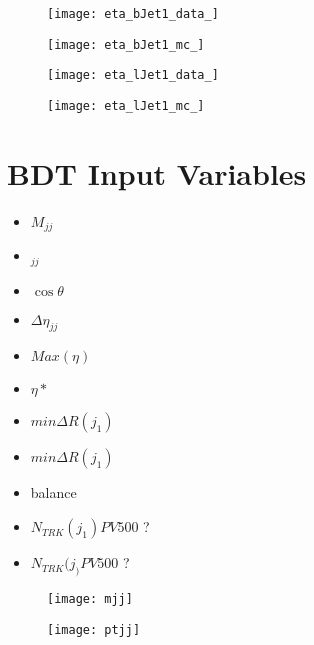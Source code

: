 				\begin{figure}[h]
					\centering

					\begin{minipage}[h]{0.33\linewidth}
						\texttt{[image: eta\_bJet1\_data\_]}
					\end{minipage}
					\quad
					\begin{minipage}[h]{0.33\linewidth}
						\texttt{[image: eta\_bJet1\_mc\_]}
					\end{minipage}

					\begin{minipage}[h]{0.33\linewidth}
						\texttt{[image: eta\_lJet1\_data\_]}
					\end{minipage}
					\quad
					\begin{minipage}[h]{0.33\linewidth}
						\texttt{[image: eta\_lJet1\_mc\_]}
					\end{minipage}
					\label{fig:kin:eta2c4j}
				\end{figure}


\section{BDT Input Variables}

	\begin{itemize}
		\item $M_{jj}$
		\item \pt$_{jj}$
		\item $\cos \theta$
		\item $\Delta\eta_{jj}$
		\item $Max(\eta)$
		\item $\eta*$
		\item $min\Delta R(j_1)$
		\item $min\Delta R(j_1)$
		\item \pt balance
		\item $N_{TRK}(j_1) PV500$ ?
		\item $N_{TRK}(j_) PV500$ ?
	\end{itemize}

		\begin{figure}[h]
			\begin{minipage}[h]{0.45\linewidth}
				\texttt{[image: mjj]}
				\caption{}
				\label{fig:bdtmjj}
			\end{minipage}
			\quad
			\begin{minipage}[h]{0.45\linewidth}
				\texttt{[image: ptjj]}
				\caption{}
				\label{fig:bdtptjj}
			\end{minipage}
		\end{figure}


